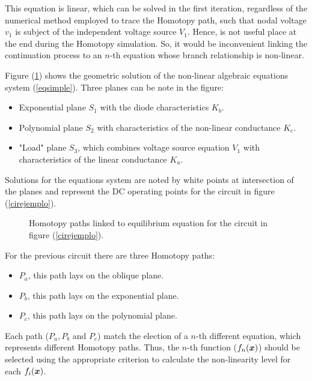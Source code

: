 \documentclass[conference,letterpaper,onecolumn,11pt]{IEEEtran}
\newcommand{\pig}[1]{\mbox{\boldmath ${#1}$}	}
\begin{document}
This equation is linear, which can be solved in the first iteration, regardless of the numerical method employed to trace the Homotopy path, such that nodal voltage $v_1$ is subject of the independent voltage source $V_1$. Hence, is not useful place at the end during the Homotopy simulation. So, it would be inconvenient linking the continuation process to an $n$-th equation whose branch relationship is non-linear.

Figure (\ref{rutas}) shows the geometric solution of the non-linear algebraic equations system (\ref{eqsimple}). Three planes can be note in the figure:

\begin{itemize}
\item  Exponential plane $S_1$ with the diode characteristics $K_b$.
\item  Polynomial plane $S_2$ with characteristics of the non-linear conductance $K_c$.
\item  "Load" plane $S_3$, which combines voltage source equation $V_1$ with characteristics of the linear conductance $K_a$.
\end{itemize}

Solutions for the equations system are noted by white points at intersection of the planes and represent the DC operating points for the circuit in figure (\ref{cirejemplo}).

\begin{figure}[!h]
\centerline{
\epsfxsize=70mm
}
\caption{Homotopy paths linked to equilibrium equation for the circuit in figure  (\ref{cirejemplo}).}
\label{rutas}
\end{figure}

For the previous circuit there are three Homotopy paths:

\begin{itemize}
\item $P_a$, this path lays on the oblique plane.
\item $P_b$, this path lays on the exponential plane.
\item $P_c$, this path lays on the polynomial plane.
\end{itemize}

Each path ($P_a,P_b$ and $P_c$) match the election of a $n$-th different equation, which represents different Homotopy paths. Thus, the $n$-th function ($f_n(\pig{x})$) should be selected using the appropriate criterion to calculate the non-linearity level for each $f_i(\pig{x})$.
\end{document}
